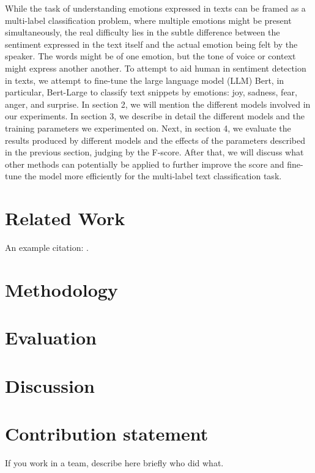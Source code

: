 \documentclass[11pt]{article}
\begin{document}
While the task of understanding emotions expressed in texts can be framed as a multi-label classification problem, where multiple emotions might be present simultaneously, the real difficulty lies in the subtle difference between the sentiment expressed in the text itself and the actual emotion being felt by the speaker. The words might be of one emotion, but the tone of voice or context might express another another. To attempt to aid human in sentiment detection in texts, we attempt to fine-tune the large language model (LLM) Bert, in particular, Bert-Large to classify text snippets by emotions: joy, sadness, fear, anger, and surprise. In section 2, we will mention the different models involved in our experiments. In section 3, we describe in detail the different models and the training parameters we experimented on. Next, in section 4, we evaluate the results produced by different models and the effects of the parameters described in the previous section, judging by the F-score. After that, we will discuss what other methods can potentially be applied to further improve the score and fine-tune the model more efficiently for the multi-label text classification task. 

\section{Related Work}

An example citation: \cite{dijkstra1968goto}.


\section{Methodology}

\section{Evaluation}

\section{Discussion}


\section{Contribution statement}

If you work in a team, describe here briefly who did what.
\end{document}
